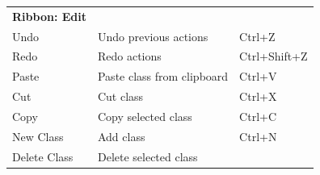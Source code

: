 \begin{table}[H]
\begin{tabular}{lll}
		&                                                                       
		              \\
		 \hline
		\textbf{Ribbon: Edit}      
		&                                                                       
		                     &
		                                                                        
		             \\ \hline
		Undo                       & Undo previous 
		actions                                                                 
		     &
		 
		Ctrl+Z                                                                  
		            \\
		Redo                       & Redo 
		actions                                                                 
		              &
		 
		Ctrl+Shift+Z                                                            
		            \\
		Paste                      & Paste class from 
		clipboard                                                               
		  &
		 
		Ctrl+V                                                                  
		            \\
		Cut                        & Cut 
		class                                                                   
		               &
		 
		Ctrl+X                                                                  
		            \\
		Copy                       & Copy selected 
		class                                                                   
		     &
		 
		Ctrl+C                                                                  
		            \\
		New Class                  & Add 
		class                                                                   
		               &
		 
		Ctrl+N                                                                  
		            \\
		Delete Class               & Delete selected 
		class                                                                   
		   &
		 

\end{tabular}
\end{table}
